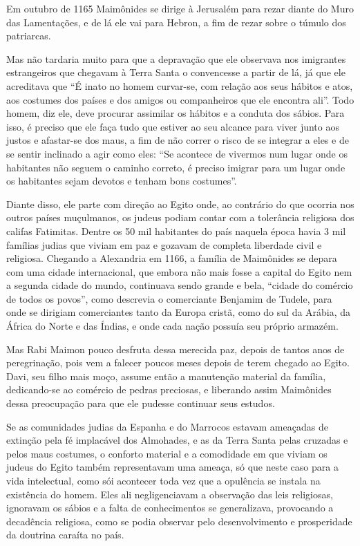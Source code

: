 Em outubro de 1165 Maimônides se dirige à Jerusalém para rezar diante
do Muro das Lamentações, e de lá ele vai para Hebron, a fim de rezar
sobre o túmulo dos patriarcas.

Mas não tardaria muito para que a depravação que ele observava nos
imigrantes estrangeiros que chegavam à Terra Santa o convencesse a
partir de lá, já que ele acreditava que ``É inato no homem curvar-se,
com relação aos seus hábitos e atos, aos costumes dos países e dos
amigos ou companheiros que ele encontra ali''. Todo homem, diz ele, deve
procurar assimilar os hábitos e a conduta dos sábios. Para isso, é
preciso que ele faça tudo que estiver ao seu alcance para viver junto
aos justos e afastar-se dos maus, a fim de não correr o risco de se
integrar a eles e de se sentir inclinado a agir como eles: ``Se acontece
de vivermos num lugar onde os habitantes não seguem o caminho correto, é
preciso imigrar para um lugar onde os habitantes sejam devotos e tenham
bons costumes''.

Diante disso, ele parte com direção ao Egito onde, ao contrário do que
ocorria nos outros países muçulmanos, os judeus podiam contar com a
tolerância religiosa dos califas Fatimitas. Dentre os 50 mil habitantes
do país naquela época havia 3 mil famílias judias que viviam em paz e
gozavam de completa liberdade civil e religiosa. Chegando a Alexandria
em 1166, a família de Maimônides se depara com uma cidade internacional,
que embora não mais fosse a capital do Egito nem a segunda cidade do
mundo, continuava sendo grande e bela, ``cidade do comércio de todos os
povos'', como descrevia o comerciante Benjamim de Tudele, para onde se
dirigiam comerciantes tanto da Europa cristã, como do sul da Arábia, da
África do Norte e das Índias, e onde cada nação possuía seu próprio
armazém.

Mas Rabi Maimon pouco desfruta dessa merecida paz, depois de tantos
anos de peregrinação, pois vem a falecer poucos meses depois de terem
chegado ao Egito. Davi, seu filho mais moço, assume então a manutenção
material da família, dedicando-se ao comércio de pedras preciosas, e
liberando assim Maimônides dessa preocupação para que ele pudesse
continuar seus estudos.

Se as comunidades judias da Espanha e do Marrocos estavam ameaçadas de
extinção pela fé implacável dos Almohades, e as da Terra Santa pelas
cruzadas e pelos maus costumes, o conforto material e a comodidade em
que viviam os judeus do Egito também representavam uma ameaça, só que
neste caso para a vida intelectual, como sói acontecer toda vez que a
opulência se instala na existência do homem. Eles ali negligenciavam a
observação das leis religiosas, ignoravam os sábios e a falta de
conhecimentos se generalizava, provocando a decadência religiosa, como
se podia observar pelo desenvolvimento e prosperidade da doutrina
caraíta no país.

